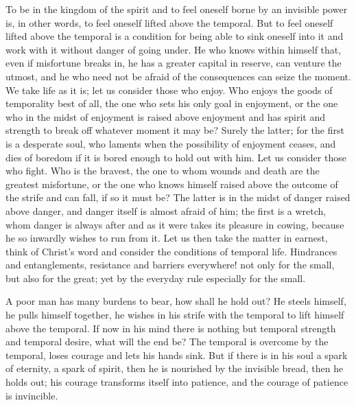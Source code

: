 \documentclass[12pt,a4paper,openany]{book}
\newcommand{\opage}[1]{\marginnote{\footnotesize\textit{[#1]}}}
\begin{document}
To be in the kingdom of the spirit and to feel oneself borne by an invisible power is, in other words, to feel oneself lifted above the temporal. But to feel oneself lifted above the temporal is a condition for being able to sink oneself into it and work with it without danger of going under. He who knows within himself that, even if misfortune breaks in, he has a greater capital in reserve, can venture the utmost, and he who need not be afraid of
\setcounter{footnote}{0}%
\opage{28}the consequences can seize the moment. We take life as it is; let us consider those who enjoy. Who enjoys the goods of temporality best of all, the one who sets his only goal in enjoyment, or the one who in the midst of enjoyment is raised above enjoyment and has spirit and strength to break off whatever moment it may be? Surely the latter; for the first is a desperate soul, who laments when the possibility of enjoyment ceases, and dies of boredom if it is bored enough to hold out with him. Let us consider those who fight. Who is the bravest, the one to whom wounds and death are the greatest misfortune, or the one who knows himself raised above the outcome of the strife and can fall, if so it must be? The latter is in the midst of danger raised above danger, and danger itself is almost afraid of him; the first is a wretch, whom danger is always after and as it were takes its pleasure in cowing, because he so inwardly wishes to run from it. Let us then take the matter in earnest, think of Christ's word and consider the conditions of temporal life. Hindrances and entanglements, resistance and barriers everywhere! not only for the small, but also for the great; yet by the everyday rule especially for the small.

A poor man has many burdens to bear, how shall he hold out? He steels himself, he pulls himself together, he wishes in his strife with the temporal to lift himself above the temporal. If now in his mind there is nothing but temporal strength and temporal desire, what will the end be? The temporal is overcome by the temporal, loses courage and lets his hands sink. But if there is in his soul a spark of eternity, a spark of spirit, then he is nourished by the invisible
\setcounter{footnote}{0}%
\opage{29}bread, then he holds out; his courage transforms itself into patience, and the courage of patience is invincible.
\end{document}
